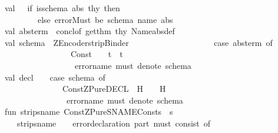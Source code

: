 \begin{isabellebody}
\ \ \ \ \ \ \ val\ {\isacharunderscore}\ {\isacharequal}\ if\ is{\isacharunderscore}schema\ abs\ thy\ then\ {\isacharparenleft}{\isacharparenright}\isanewline
\ \ \ \ \ \ \ \ \ \ \ \ \ \ \ else\ error{\isacharparenleft}{\isachardoublequote}Must\ be\ schema\ name{\isacharcolon}\ {\isachardoublequote}{\isacharcircum}abs{\isacharparenright}\isanewline
\ \ \ \ \ \ \ val\ abs{\isacharunderscore}term\ {\isacharequal}\ concl{\isacharunderscore}of\ {\isacharparenleft}get{\isacharunderscore}thm\ thy\ {\isacharparenleft}Name{\isacharparenleft}abs{\isacharcircum}{\isachardoublequote}{\isacharunderscore}def{\isachardoublequote}{\isacharparenright}{\isacharparenright}{\isacharparenright}\ \isanewline
\isanewline
\ \ \ \ \ \ \ val\ schema\ {\isacharequal}\ ZEncoder{\isachardot}strip{\isacharunderscore}Binder\isanewline
\ \ \ \ \ \ \ \ \ \ \ \ \ \ \ \ \ \ \ \ {\isacharparenleft}case\ abs{\isacharunderscore}term\ of\isanewline
\ \ \ \ \ \ \ \ \ \ \ \ \ \ \ \ \ \ \ \ \ \ \ Const{\isacharparenleft}{\isachardoublequote}{\isacharequal}{\isacharequal}{\isachardoublequote}{\isacharcomma}{\isacharunderscore}{\isacharparenright}\ {\isachardollar}\ {\isacharunderscore}\ {\isachardollar}\ t\ {\isacharequal}{\isachargreater}\ t\isanewline
\ \ \ \ \ \ \ \ \ \ \ \ \ \ \ \ \ \ \ \ \ {\isacharbar}\ {\isacharunderscore}\ {\isacharequal}{\isachargreater}\ error{\isacharparenleft}{\isachardoublequote}name\ must\ denote\ schema{\isacharbang}{\isachardoublequote}{\isacharparenright}{\isacharparenright}\isanewline
\ \ \ \ \ \ \ val\ decl\ \ \ {\isacharequal}\ {\isacharparenleft}case\ schema\ of\isanewline
\ \ \ \ \ \ \ \ \ \ \ \ \ \ \ \ \ \ \ \ \ Const{\isacharparenleft}{\isachardoublequote}ZPure{\isachardot}DECL{\isachardoublequote}{\isacharcomma}{\isacharunderscore}{\isacharparenright}\ {\isachardollar}\ H\ {\isachardollar}\ {\isacharunderscore}\ {\isacharequal}{\isachargreater}\ H\isanewline
\ \ \ \ \ \ \ \ \ \ \ \ \ \ \ \ \ \ \ \ {\isacharbar}{\isacharunderscore}\ {\isacharequal}{\isachargreater}\ error{\isacharparenleft}{\isachardoublequote}name\ must\ denote\ schema{\isacharbang}{\isachardoublequote}{\isacharparenright}{\isacharparenright}\isanewline
\ \ \ \ \ \ \ fun\ strip{\isacharunderscore}sname\ {\isacharparenleft}Const{\isacharparenleft}{\isachardoublequote}ZPure{\isachardot}SNAME{\isachardoublequote}{\isacharcomma}{\isacharunderscore}{\isacharparenright}{\isachardollar}{\isacharparenleft}Const{\isacharparenleft}s{\isacharcomma}{\isacharunderscore}{\isacharparenright}{\isacharparenright}{\isachardollar}{\isacharunderscore}{\isacharparenright}\ {\isacharequal}\ s\isanewline
\ \ \ \ \ \ \ \ \ \ {\isacharbar}strip{\isacharunderscore}sname\ \ {\isacharunderscore}\ {\isacharequal}\ error{\isacharparenleft}{\isachardoublequote}declaration\ part\ must\ consist\ of\ {\isacharbackslash}\isanewline

\end{isabellebody}
